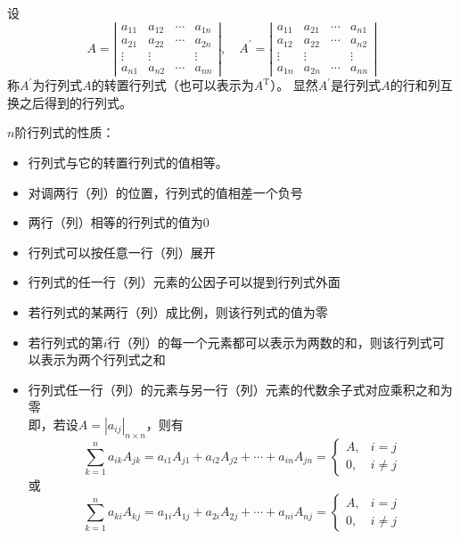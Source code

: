 \begin{definition}[转置行列式]
  设$$
  A=\left|\begin{array}{cccc}
  a_{11} & a_{12} & \cdots & a_{1 n} \\
  a_{21} & a_{22} & \cdots & a_{2 n} \\
  \vdots & \vdots & & \vdots \\
  a_{n 1} & a_{n 2} & \cdots & a_{n n}
  \end{array}\right|, \quad A^{\prime}=\left|\begin{array}{cccc}
  a_{11} & a_{21} & \cdots & a_{n 1} \\
  a_{12} & a_{22} & \cdots & a_{n 2} \\
  \vdots & \vdots & & \vdots \\
  a_{1 n} & a_{2 n} & \cdots & a_{n n}
  \end{array}\right|
  $$
  称$A^{\prime}$为行列式$A$的{\heiti 转置行列式}（也可以表示为$A^{\mathrm{T}}$）。
  显然$A^{\prime}$是行列式$A$的行和列互换之后得到的行列式。
\end{definition}

\begin{theorem}
  $n$阶行列式的性质：
  \begin{itemize}
    \item 行列式与它的转置行列式的值相等。
    \item 对调两行（列）的位置，行列式的值相差一个负号
    \item 两行（列）相等的行列式的值为0
    \item 行列式可以按任意一行（列）展开
    \item 行列式的任一行（列）元素的公因子可以提到行列式外面
    \item 若行列式的某两行（列）成比例，则该行列式的值为零
    \item 若行列式的第$i$行（列）的每一个元素都可以表示为两数的和，则该行列式可以表示为两个行列式之和
    \item 行列式任一行（列）的元素与另一行（列）元素的代数余子式对应乘积之和为零\\即，若设$A=|a_{ij}|_{n\times n}$，则有
    $$
    \sum_{k=1}^{n} a_{i k} A_{j k}=a_{i 1} A_{j 1}+a_{i 2} A_{j 2}+\cdots+a_{i n} A_{j n}=\left\{\begin{array}{ll}
    A, & i=j \\
    0, & i \neq j
    \end{array}\right.
    $$
    或
    $$
    \sum_{k=1}^{n} a_{ki} A_{kj}=a_{1i} A_{1j}+a_{2i} A_{2j}+\cdots+a_{ni} A_{nj}=\left\{\begin{array}{ll}
    A, & i=j \\
    0, & i \neq j
    \end{array}\right.
    $$
  \end{itemize}
\end{theorem}

